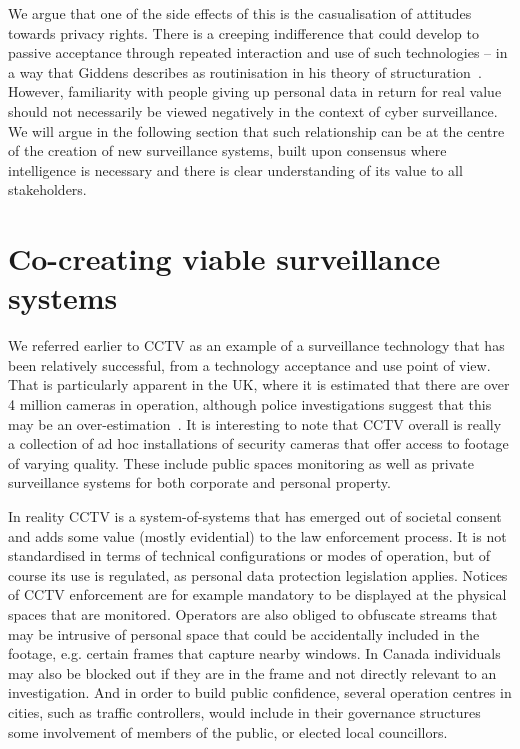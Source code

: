 \documentclass{llncs}
\begin{document}
We argue that one of the side effects of this is the casualisation of attitudes towards privacy rights. There is a creeping indifference that could develop to passive acceptance through repeated interaction and use of such technologies -- in a way that Giddens describes as routinisation in his theory of structuration~\cite{Giddens}. However, familiarity with people giving up personal data in return for real value should not necessarily be viewed negatively in the context of cyber surveillance. We will argue in the following section that such relationship can be at the centre of the creation of new surveillance systems, built upon consensus where intelligence is necessary and there is clear understanding of its value to all stakeholders.

\section{Co-creating viable surveillance systems}
\label{sec:Creating}

We referred earlier to CCTV as an example of a surveillance technology that has been relatively successful, from a technology acceptance and use point of view. That is particularly apparent in the UK, where it is estimated that there are over 4 million cameras in operation, although police investigations suggest that this may be an over-estimation~\cite{HomeOffice}. It is interesting to note that CCTV overall is really a collection of ad hoc installations of security cameras that offer access to footage of varying quality. These include public spaces monitoring as well as private surveillance systems for both corporate and personal property.

In reality CCTV is a system-of-systems that has emerged out of societal consent and adds some value (mostly evidential) to the law enforcement process. It is not standardised in terms of technical configurations or modes of operation, but of course its use is regulated, as personal data protection legislation applies. Notices of CCTV enforcement are for example mandatory to be displayed at the physical spaces that are monitored. Operators are also obliged to obfuscate streams that may be intrusive of personal space that could be accidentally included in the footage, e.g. certain frames that capture nearby windows. In Canada individuals may also be blocked out if they are in the frame and not directly relevant to an investigation. And in order to build public confidence, several operation centres in cities, such as traffic controllers, would include in their governance structures some involvement of members of the public, or elected local councillors.
\end{document}
